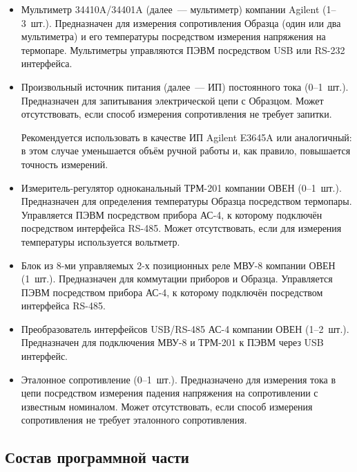 \documentclass[12pt, a4paper, twocolumn]{report}
\begin{document}
\begin{itemize}

\item Мультиметр 34410A/34401A (далее~--- мультиметр) компании Agilent (1--3~шт.). Предназначен для измерения сопротивления Образца (один или два мультиметра) и его температуры посредством измерения напряжения на термопаре. Мультиметры управляются ПЭВМ посредством USB или RS-232 интерфейса.

\item Произвольный источник питания (далее~--- ИП) постоянного тока (0--1~шт.). Предназначен для запитывания электрической цепи с Образцом. Может отсутствовать, если способ измерения сопротивления не требует запитки.

Рекомендуется использовать в качестве ИП Agilent E3645A или аналогичный: в этом случае уменьшается объём ручной работы и, как правило, повышается точность измерений.

\item Измеритель-регулятор одноканальный ТРМ-201 компании ОВЕН (0--1~шт.). Предназначен для определения температуры Образца посредством термопары. Управляется ПЭВМ посредством прибора АС-4, к которому подключён посредством интерфейса RS-485. Может отсутствовать, если для измерения температуры используется вольтметр.

\item Блок из 8-ми управляемых 2-х позиционных реле МВУ-8 компании ОВЕН (1~шт.). Предназначен для коммутации приборов и Образца. Управляется ПЭВМ посредством прибора АС-4, к которому подключён посредством интерфейса RS-485.

\item Преобразователь интерфейсов USB/RS-485 АС-4 компании ОВЕН (1--2~шт.). Предназначен для подключения МВУ-8 и ТРМ-201 к ПЭВМ через USB интерфейс.

\item Эталонное сопротивление (0--1~шт.). Предназначено для измерения тока в цепи посредством измерения падения напряжения на сопротивлении с известным номиналом. Может отсутствовать, если способ измерения сопротивления не требует эталонного сопротивления.

\end{itemize}

\subsection{Состав программной части}
\label{sec_software}
\end{document}
